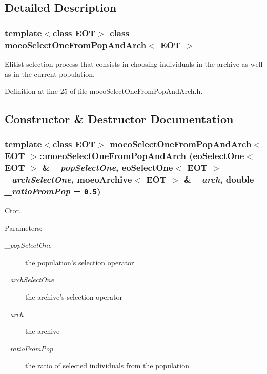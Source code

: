 \subsection{Detailed Description}
\subsubsection*{template$<$class EOT$>$ class moeo\-Select\-One\-From\-Pop\-And\-Arch$<$ EOT $>$}

Elitist selection process that consists in choosing individuals in the archive as well as in the current population. 



Definition at line 25 of file moeo\-Select\-One\-From\-Pop\-And\-Arch.h.

\subsection{Constructor \& Destructor Documentation}
\subsubsection{\setlength{\rightskip}{0pt plus 5cm}template$<$class EOT$>$ {\bf moeo\-Select\-One\-From\-Pop\-And\-Arch}$<$ EOT $>$::{\bf moeo\-Select\-One\-From\-Pop\-And\-Arch} (eo\-Select\-One$<$ EOT $>$ \& {\em \_\-pop\-Select\-One}, eo\-Select\-One$<$ EOT $>$ {\em \_\-arch\-Select\-One}, {\bf moeo\-Archive}$<$ EOT $>$ \& {\em \_\-arch}, double {\em \_\-ratio\-From\-Pop} = {\tt 0.5})\hspace{0.3cm}{\tt  [inline]}}\label{classmoeoSelectOneFromPopAndArch_8d75155e2bb6994b080c696d6382c6c9}


Ctor. 

\begin{Desc}
\item[Parameters:]
\begin{description}
\item[{\em \_\-pop\-Select\-One}]the population's selection operator \item[{\em \_\-arch\-Select\-One}]the archive's selection operator \item[{\em \_\-arch}]the archive \item[{\em \_\-ratio\-From\-Pop}]the ratio of selected individuals from the population \end{description}
\end{Desc}


